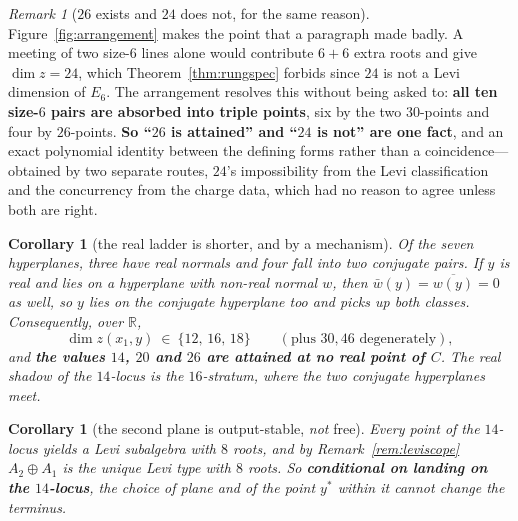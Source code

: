 \documentclass[11pt,reqno]{amsart}
\theoremstyle{plain}
\newtheorem{corollary}[theorem]{Corollary}
\theoremstyle{definition}
\theoremstyle{remark}
\newtheorem{remark}[theorem]{Remark}
\newcommand{\R}{\mathbb{R}}
\begin{document}
\begin{remark}[$26$ exists and $24$ does not, for the same reason]\label{rem:2426}
Figure~\ref{fig:arrangement} makes the point that a paragraph made badly. A meeting of
two size-$6$ lines alone would contribute $6+6$ extra roots and give $\dim z=24$, which
Theorem~\ref{thm:rungspec} forbids since $24$ is not a Levi dimension of $E_6$. The
arrangement resolves this without being asked to: \textbf{all ten size-$6$ pairs are
absorbed into triple points}, six by the two $30$-points and four by $26$-points.
\textbf{So ``$26$ is attained'' and ``$24$ is not'' are one fact}, and an exact
polynomial identity between the defining forms rather than a coincidence---obtained by
two separate routes, $24$'s impossibility from the Levi classification and the
concurrency from the charge data, which had no reason to agree unless both are right.
\end{remark}

\begin{corollary}[the real ladder is shorter, and by a mechanism]\label{cor:realladder}
Of the seven hyperplanes, three have real normals and four fall into two conjugate pairs.
If $y$ is real and lies on a hyperplane with non-real normal $w$, then $\bar w(y)=
\overline{w(y)}=0$ as well, so $y$ lies on the conjugate hyperplane too and picks up
\emph{both} classes. Consequently, over $\R$,
\[
   \dim z(x_1,y)\ \in\ \{12,\,16,\,18\}\qquad(\text{plus }30,46\text{ degenerately}),
\]
and \textbf{the values $14$, $20$ and $26$ are attained at no real point of $C$}. The real
shadow of the $14$-locus is the $16$-stratum, where the two conjugate hyperplanes meet.
\end{corollary}

\begin{corollary}[the second plane is output-stable, \emph{not} free]\label{cor:c7free}
Every point of the $14$-locus yields a Levi subalgebra with $8$ roots, and by
Remark~\ref{rem:leviscope} $A_2\oplus A_1$ is the unique Levi type with $8$ roots. So
\textbf{conditional on landing on the $14$-locus}, the choice of plane and of the point
$y^*$ within it cannot change the terminus.
\end{corollary}
\end{document}
